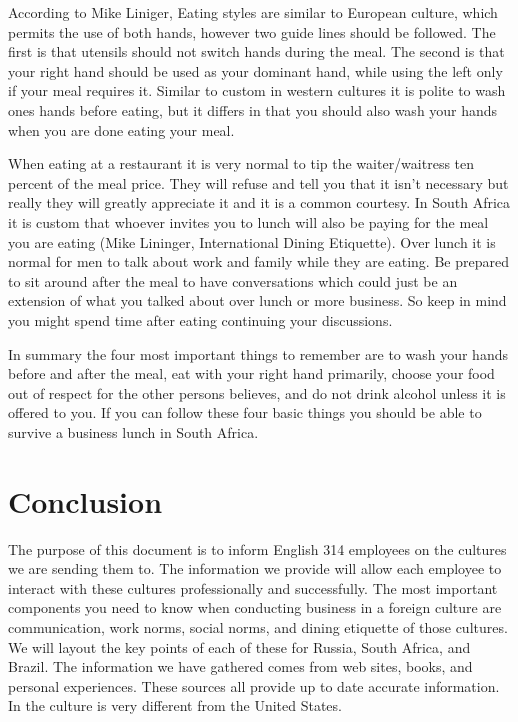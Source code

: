 \documentclass[11pt,a4paper,oneside]{report}
\begin{document}
According to Mike Liniger, Eating styles are similar to European culture, which
permits the use of both hands, however two guide lines should be followed. The
first is that utensils should not switch hands during the meal.  The second is
that your right hand should be used as your dominant hand, while using the left
only if your meal requires it. Similar to custom in western cultures it is
polite to wash ones hands before eating, but it differs in that you should also
wash your hands when you are done eating your meal.

When eating at a restaurant it is very normal to tip the waiter/waitress ten
percent of the meal price. They will refuse and tell you that it isn’t
necessary but really they will greatly appreciate it and it is a common
courtesy. In South Africa it is custom that whoever invites you to lunch will
also be paying for the meal you are eating (Mike Lininger, International Dining
Etiquette). Over lunch it is normal for men to talk about work and family while
they are eating. Be prepared to sit around after the meal to have conversations
which could just be an extension of what you talked about over lunch or more
business. So keep in mind you might spend time after eating continuing your
discussions.

In summary the four most important things to remember are to wash your hands
before and after the meal, eat with your right hand primarily, choose your food
out of respect for the other persons believes, and do not drink alcohol unless
it is offered to you. If you can follow these four basic things you should be
able to survive a business lunch in South Africa.

\section{Conclusion}\label{first}

The purpose of this document is to inform English 314 employees on the cultures
we are sending them to.  The information we provide will allow each employee to
interact with these cultures professionally and successfully. The most
important components you need to know when conducting business in a foreign
culture are communication, work norms, social norms, and dining etiquette of
those cultures. We will layout the key points of each of these for Russia,
South Africa, and Brazil. The information we have gathered comes from web
sites, books, and personal experiences. These sources all provide up to date
accurate information. In the culture is very different from the United
States.
\end{document}
